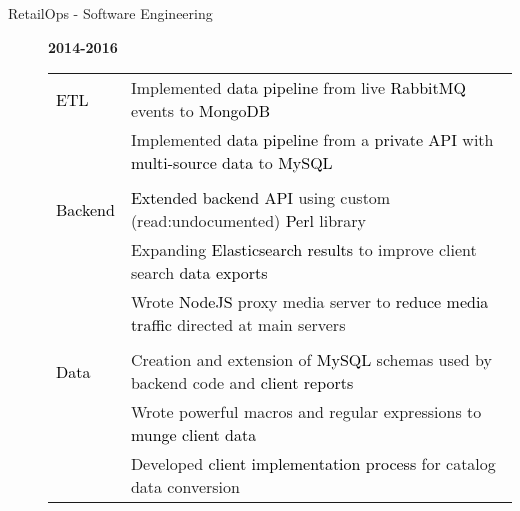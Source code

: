 \documentclass[12pt]{article}
\begin{document}
\begin{description}
\begin{description}
                \item[RetailOps - Software Engineering] \hfill \textbf{2014-2016}\\
                \textcolor{gray}{
                    \begin{tabular}{l|l}
                        \\[-1.0mm]
                        \textcolor{black}{ETL}
                            & Implemented \textcolor{black}{data pipeline} from live \textcolor{black}{RabbitMQ} events to \textcolor{black}{MongoDB}\\
                            & Implemented \textcolor{black}{data pipeline} from a \textcolor{black}{private API} with \textcolor{black}{multi-source data} to \textcolor{black}{MySQL}\\
                        \\[-1.7mm]
                        \textcolor{black}{Backend}
                            & \textcolor{black}{Extended backend API} using custom (read:undocumented) \textcolor{black}{Perl} library\\
                            & Expanding \textcolor{black}{Elasticsearch results} to improve client search \textcolor{black}{data exports}\\
                            & Wrote \textcolor{black}{NodeJS} proxy media server to \textcolor{black}{reduce media traffic} directed at main servers \\
                        \\[-1.7mm]
                        \textcolor{black}{Data}       
                            & Creation and extension of \textcolor{black}{MySQL} schemas used by backend code and \textcolor{black}{client reports}\\
                            & Wrote powerful macros and regular expressions to \textcolor{black}{munge client data}\\
                            & Developed \textcolor{black}{client implementation process} for catalog data conversion\\
                    \end{tabular}
		        }
            \end{description}


\end{description}
\end{document}

